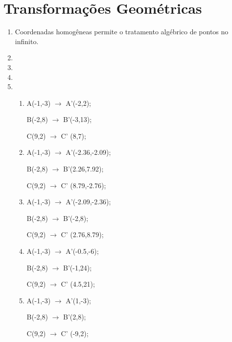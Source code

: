 \section*{Transformações Geométricas}

	\begin{enumerate}[label=\arabic*)]
	    \setlength\itemsep{1em}
	    
		\item Coordenadas homogêneas permite o tratamento algébrico de pontos
	   no infinito.
		
		\item 

		\item 

		\item 

		\item 
				
				\begin{enumerate}[label=\alph*.]
				   \setlength\itemsep{1em}
					\item					
					   				
					   				A(-1,-3) $\rightarrow$ A'(-2,2);
				
									B(-2,8)  $\rightarrow$ B'(-3,13);
				
									C(9,2)  $\rightarrow$ C' (8,7);
					\item 
					
								    A(-1,-3) $\rightarrow$ A'(-2.36,-2.09);
				
									B(-2,8)  $\rightarrow$ B'(2.26,7.92);
				
									C(9,2)  $\rightarrow$ C' (8.79,-2.76);
					\item 
					
									A(-1,-3) $\rightarrow$ A'(-2.09,-2.36);
				
									B(-2,8)  $\rightarrow$ B'(-2,8);
				
									C(9,2)  $\rightarrow$ C' (2.76,8.79);
					\item
					
									A(-1,-3) $\rightarrow$ A'(-0.5,-6);
				
									B(-2,8)  $\rightarrow$ B'(-1,24);
				
									C(9,2)  $\rightarrow$ C' (4.5,21);
					\item
									
									A(-1,-3) $\rightarrow$ A'(1,-3);
				
									B(-2,8)  $\rightarrow$ B'(2,8);
				
									C(9,2)  $\rightarrow$ C' (-9,2);
								
				\end{enumerate}

	\end{enumerate}
	

